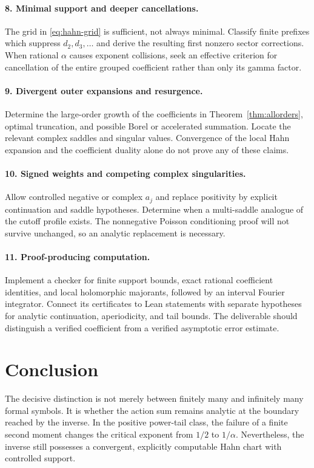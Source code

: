 \documentclass[11pt,a4paper]{article}
\numberwithin{equation}{section}
\theoremstyle{definition}
\theoremstyle{remark}
\begin{document}
\paragraph{8. Minimal support and deeper cancellations.}
The grid in \eqref{eq:hahn-grid} is sufficient, not always minimal.
Classify finite prefixes which suppress $d_2,d_3,\ldots$ and derive the
resulting first nonzero sector corrections. When rational $\alpha$
causes exponent collisions, seek an effective criterion for cancellation
of the entire grouped coefficient rather than only its gamma factor.

\paragraph{9. Divergent outer expansions and resurgence.}
Determine the large-order growth of the coefficients in
Theorem~\ref{thm:allorders}, optimal truncation, and possible Borel or
accelerated summation. Locate the relevant complex saddles and singular
values. Convergence of the local Hahn expansion and the coefficient
duality alone do not prove any of these claims.

\paragraph{10. Signed weights and competing complex singularities.}
Allow controlled negative or complex $a_j$ and replace positivity by
explicit continuation and saddle hypotheses. Determine when a
multi-saddle analogue of the cutoff profile exists. The nonnegative
Poisson conditioning proof will not survive unchanged, so an analytic
replacement is necessary.

\paragraph{11. Proof-producing computation.}
Implement a checker for finite support bounds, exact rational coefficient
identities, and local holomorphic majorants, followed by an interval
Fourier integrator. Connect its certificates to Lean statements with
separate hypotheses for analytic continuation, aperiodicity, and tail
bounds. The deliverable should distinguish a verified coefficient from a
verified asymptotic error estimate.

\section{Conclusion}
The decisive distinction is not merely between finitely many and
infinitely many formal symbols. It is whether the action sum remains
analytic at the boundary reached by the inverse. In the positive
power-tail class, the failure of a finite second moment changes the
critical exponent from $1/2$ to $1/\alpha$. Nevertheless, the inverse
still possesses a convergent, explicitly computable Hahn chart with
controlled support.
\end{document}
